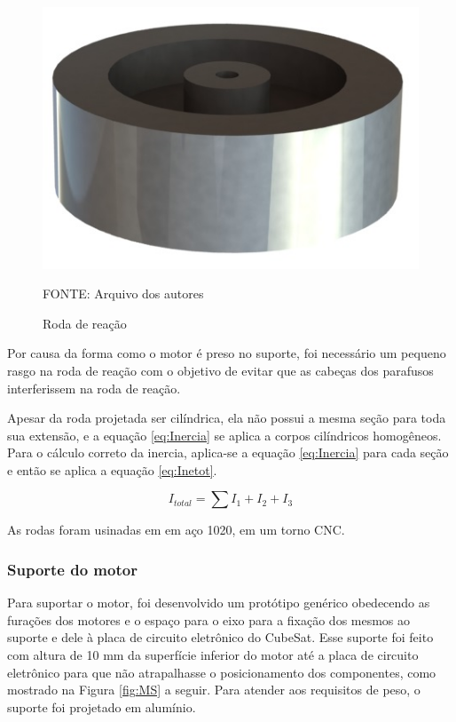 \documentclass[
	12pt,				%
	openany,			%
	twoside,			%
	a4paper,			%
	english,			%
	french,				%
	spanish,			%
	brazil,				%
	oldfontcommands
	]{abntex2}
\begin{document}
\begin{figure}[th]
	\caption{Roda de reação}
	\centering
	\includegraphics[width=0.5\linewidth]{./figs/Reaction_Wheel}
	
	\begin{small}
		FONTE: Arquivo dos autores
	\end{small}
	\label{fig:RW}
\end{figure}

Por causa da forma como o motor é preso no suporte, foi necessário um pequeno rasgo na roda de reação com o objetivo de evitar que as cabeças dos parafusos interferissem na roda de reação.

Apesar da roda projetada ser cilíndrica, ela não possui a mesma seção para toda sua extensão, e a equação \ref{eq:Inercia} se aplica a corpos cilíndricos homogêneos. Para o cálculo correto da inercia, aplica-se a equação \ref{eq:Inercia} para cada seção e então se aplica a equação \ref{eq:Inetot}.

\begin{equation}
I_{total} = \sum\nolimits I_{1} + I_{2} + I_{3}
\label{eq:Inetot}
\end{equation}

As rodas foram usinadas em em aço 1020, em um torno CNC.

\subsubsection{Suporte do motor}

Para suportar o motor, foi desenvolvido um protótipo genérico obedecendo as furações dos motores e o espaço para o eixo para a fixação dos mesmos ao suporte e dele à placa de circuito eletrônico do CubeSat. Esse suporte foi feito com altura de 10 mm da superfície inferior do motor até a placa de circuito eletrônico para que não atrapalhasse o posicionamento dos componentes, como mostrado na Figura \ref{fig:MS} a seguir. Para atender aos requisitos de peso, o suporte foi projetado em alumínio.
\end{document}
